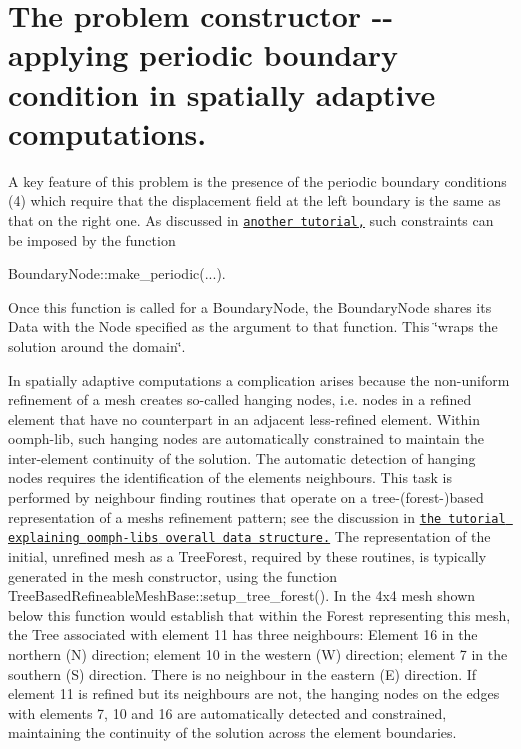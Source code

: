  

\hypertarget{index_constructor}{}\section{The problem constructor -\/-\/ applying periodic boundary condition in spatially adaptive computations.}\label{index_constructor}
A key feature of this problem is the presence of the periodic boundary conditions (4) which require that the displacement field at the left boundary is the same as that on the right one. As discussed in \href{../../../navier_stokes/rayleigh_channel/html/index.html#periodic}{\tt another tutorial,} such constraints can be imposed by the function 
\begin{DoxyCode}
BoundaryNode::make\_periodic(...).
\end{DoxyCode}
 Once this function is called for a {\ttfamily Boundary\+Node}, the {\ttfamily Boundary\+Node} shares its {\ttfamily Data} with the {\ttfamily Node} specified as the argument to that function. This \char`\"{}wraps the solution around the domain\char`\"{}.

In spatially adaptive computations a complication arises because the non-\/uniform refinement of a mesh creates so-\/called hanging nodes, i.\+e. nodes in a refined element that have no counterpart in an adjacent less-\/refined element. Within {\ttfamily oomph-\/lib}, such hanging nodes are automatically constrained to maintain the inter-\/element continuity of the solution. The automatic detection of hanging nodes requires the identification of the elements\textquotesingle{} neighbours. This task is performed by neighbour finding routines that operate on a tree-\/(forest-\/)based representation of a mesh\textquotesingle{}s refinement pattern; see the discussion in \href{../../../the_data_structure/html/index.html#QuadTreeInMeshes}{\tt the tutorial explaining {\ttfamily oomph-\/lib\textquotesingle{}s} overall data structure.} The representation of the initial, unrefined mesh as a {\ttfamily Tree\+Forest}, required by these routines, is typically generated in the mesh constructor, using the function {\ttfamily Tree\+Based\+Refineable\+Mesh\+Base\+::setup\+\_\+tree\+\_\+forest()}. In the 4x4 mesh shown below this function would establish that within the {\ttfamily Forest} representing this mesh, the {\ttfamily Tree} associated with element 11 has three neighbours\+: Element 16 in the northern (N) direction; element 10 in the western (W) direction; element 7 in the southern (S) direction. There is no neighbour in the eastern (E) direction. If element 11 is refined but its neighbours are not, the hanging nodes on the edges with elements 7, 10 and 16 are automatically detected and constrained, maintaining the continuity of the solution across the element boundaries.

